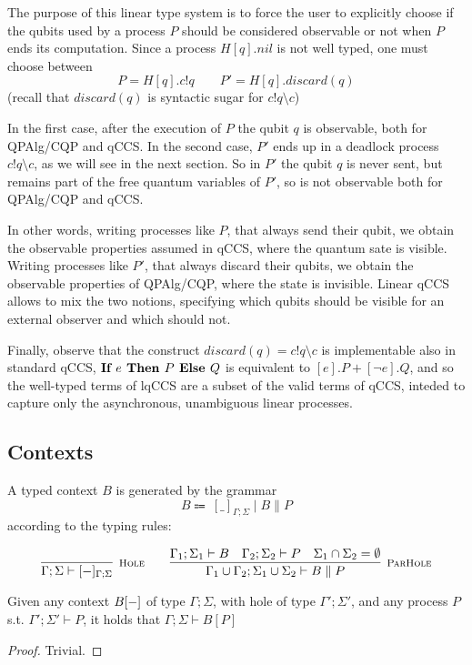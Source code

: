 The purpose of this linear type system is to force the user to explicitly choose if the qubits used by a process $P$ should be considered  observable or not when $P$ ends its computation. Since a process $H[q].nil$ is not well typed, one must choose between
\[ P = H[q].c!q \qquad P' = H[q].discard(q)
\]
(recall that $discard(q)$ is syntactic sugar for $c!q\setminus c$)

In the first case, after the execution of $P$ the qubit $q$ is observable, both for QPAlg/CQP and qCCS. In the second case, $P'$ ends up in a deadlock process $c!q \setminus c$, as we will see in the next section. So in $P'$ the qubit $q$ is never sent, but remains part of the free quantum variables of $P'$, so is not observable both for QPAlg/CQP and qCCS. 

In other words, writing processes like $P$, that always send their qubit, we obtain the observable properties assumed in qCCS, where the quantum sate is visible. Writing processes like $P'$, that always discard their qubits, we obtain the observable properties of QPAlg/CQP, where the state is invisible. Linear qCCS allows to mix the two notions, specifying which qubits should be visible for an external observer and which should not.

Finally, observe that the construct $discard(q) = c!q \setminus c$ is implementable also in standard qCCS, $\textbf{If }{e}\textbf{ Then } {P} \textbf{ Else } {Q}$ is equivalent to $[e].P + [\neg e].Q$, and so the well-typed terms of lqCCS are a subset of the valid terms of qCCS, inteded to capture only the asynchronous, unambiguous linear processes.

\subsection{Contexts}
A typed context $B$ is generated by the grammar
\[
B \Coloneqq \ [\_]_{\Gamma; \Sigma} \mid B \parallel P
\]
according to the typing rules:

\[
  \infer[\mbox{\footnotesize\scshape Hole}]{\Gamma; \Sigma \vdash [\blank]_{\Gamma; \Sigma}}{}
\qquad
\infer[\mbox{\footnotesize\scshape ParHole}]{\Gamma_1 \cup \Gamma_2; \Sigma_1 \cup \Sigma_2 \vdash B \parallel P}
{\Gamma_1; \Sigma_1 \vdash B & \Gamma_2; \Sigma_2 \vdash P & \Sigma_1 \cap \Sigma_2 = \emptyset}
\]


\begin{theorem}
	Given any context $B[{-}]$ of type $\Gamma; \Sigma$, with hole of type $\Gamma'; \Sigma'$, and any process $P$ s.t. $\Gamma'; \Sigma' \vdash P$, it holds that $\Gamma; \Sigma \vdash B[P]$ 
\end{theorem}
\begin{proof}
	Trivial.
\end{proof}